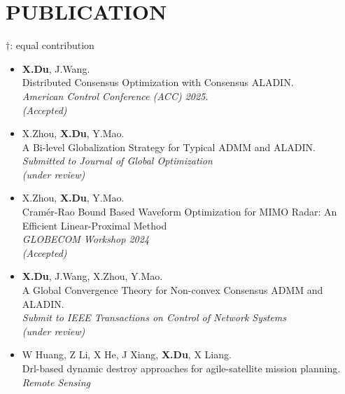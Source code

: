 \documentclass[paper=a4,fontsize=11pt]{scrartcl} %
\newcommand{\NewPart}[1]{\section*{\uppercase{#1}}}
\newcommand{\EducationEntry}[4]{
		\noindent \textbf{#1} \hfill      %
		\colorbox{White}{%
			\parbox{5cm}{%
			\hfill\color{Black}#2}} \par  %
		\noindent \textit{#3} \par        %
		\noindent\hangindent=2em\hangafter=0 \small #4 %
		\normalsize \par}
\begin{document}
\NewPart{PUBLICATION}{}
$\dag$:  equal contribution
\begin{itemize}
	
	
	
		\item  {\textbf{X.Du}, J.Wang. \\
		{ Distributed Consensus Optimization with Consensus ALADIN.}\\
		\emph{American Control Conference (ACC) 2025.\\(Accepted)
	} }
	
		\item  {X.Zhou, \textbf{X.Du},   Y.Mao. \\
		{A Bi-level Globalization Strategy for Typical  ADMM and ALADIN.}\\
		\emph{Submitted to Journal of Global Optimization\\
			(under review)
	} }
		\item  {X.Zhou, \textbf{X.Du},   Y.Mao. \\
		{Cram\'er-Rao Bound Based Waveform Optimization for MIMO Radar: An Efficient Linear-Proximal Method}\\
		\emph{GLOBECOM Workshop 2024\\
			(Accepted)
	} }
	
		\item  {\textbf{X.Du}, J.Wang, X.Zhou, Y.Mao. \\
		{A Global Convergence Theory for Non-convex Consensus ADMM and ALADIN.}\\
		\emph{Submit to  IEEE Transactions on Control of Network Systems\\
			(under review)
	} }
	
%	

	\item  {W Huang, Z Li, X He, J Xiang, \textbf{X.Du}, X Liang. \\
	{Drl-based dynamic destroy approaches for agile-satellite mission planning.}\\
	\emph{Remote Sensing\\
} }


\end{itemize}
\end{document}
